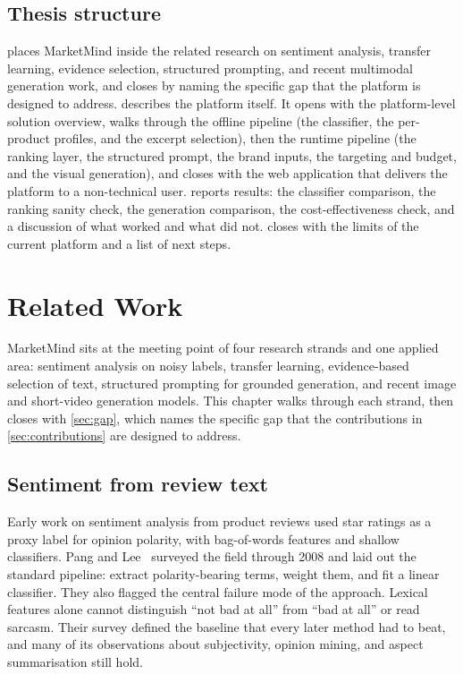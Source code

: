\documentclass[12pt,a4paper]{report}
\begin{document}
\section{Thesis structure}
\label{sec:structure}

 places MarketMind inside the related research on sentiment analysis, transfer learning, evidence selection, structured prompting, and recent multimodal generation work, and closes by naming the specific gap that the platform is designed to address.  describes the platform itself. It opens with the platform-level solution overview, walks through the offline pipeline (the classifier, the per-product profiles, and the excerpt selection), then the runtime pipeline (the ranking layer, the structured prompt, the brand inputs, the targeting and budget, and the visual generation), and closes with the web application that delivers the platform to a non-technical user.  reports results: the classifier comparison, the ranking sanity check, the generation comparison, the cost-effectiveness check, and a discussion of what worked and what did not.  closes with the limits of the current platform and a list of next steps.


\chapter{Related Work}
\label{ch:related}

MarketMind sits at the meeting point of four research strands and one applied area: sentiment analysis on noisy labels, transfer learning, evidence-based selection of text, structured prompting for grounded generation, and recent image and short-video generation models. This chapter walks through each strand, then closes with \cref{sec:gap}, which names the specific gap that the contributions in \cref{sec:contributions} are designed to address.

\section{Sentiment from review text}
\label{sec:sentiment}

Early work on sentiment analysis from product reviews used star ratings as a proxy label for opinion polarity, with bag-of-words features and shallow classifiers. Pang and Lee~\cite{pang2008opinion} surveyed the field through 2008 and laid out the standard pipeline: extract polarity-bearing terms, weight them, and fit a linear classifier. They also flagged the central failure mode of the approach. Lexical features alone cannot distinguish ``not bad at all'' from ``bad at all'' or read sarcasm. Their survey defined the baseline that every later method had to beat, and many of its observations about subjectivity, opinion mining, and aspect summarisation still hold.
\end{document}
